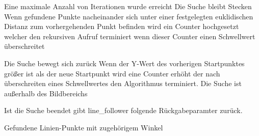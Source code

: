 Eine maximale Anzahl von Iterationen wurde erreicht
Die Suche bleibt Stecken
Wenn gefundene Punkte nacheinander sich unter einer festgelegten euklidischen Distanz zum vorhergehenden Punkt befinden wird ein Counter hochgesetzt welcher den rekursiven Aufruf terminiert wenn dieser Counter einen Schwellwert {\"u}berschreitet

Die Suche bewegt sich zur{\"u}ck
Wenn der Y-Wert des vorherigen Startpunktes gr{\"o}{\ss}er ist als der neue Startpunkt wird eine Counter erh{\"o}ht der nach {\"u}berschreiten eines Schwellwertes den Algorithmus terminiert.
Die Suche ist au{\ss}erhalb des Bildbereichs

Ist die Suche beendet gibt line\_follower folgende R{\"u}ckgabeparamter zur{\"u}ck.

Gefundene Linien-Punkte mit zugeh{\"o}rigem Winkel







